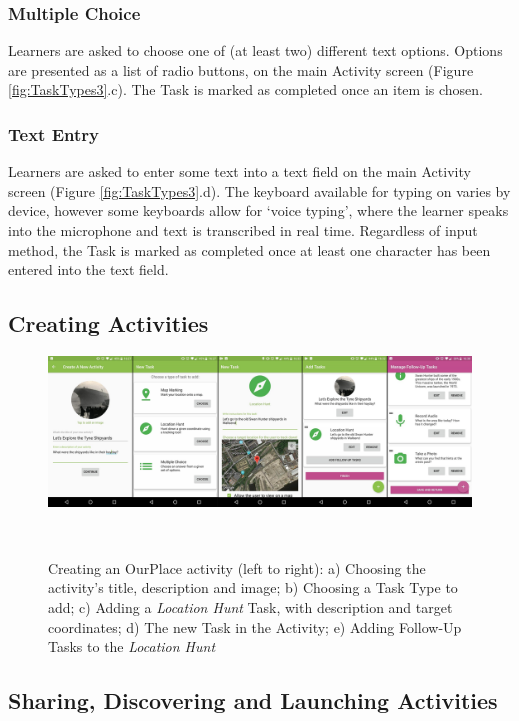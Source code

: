 \subsubsection*{Multiple Choice}
Learners are asked to choose one of (at least two) different text options. Options are presented as a list of radio buttons, on the main Activity screen (Figure \ref{fig:TaskTypes3}.c). The Task is marked as completed once an item is chosen.

\subsubsection*{Text Entry}
Learners are asked to enter some text into a text field on the main Activity screen (Figure \ref{fig:TaskTypes3}.d). The keyboard available for typing on varies by device, however some keyboards allow for `voice typing', where the learner speaks into the microphone and text is transcribed in real time. Regardless of input method, the Task is marked as completed once at least one character has been entered into the text field. 

\subsection{Creating Activities}

\begin{figure}
  \centering
  \includegraphics[width=1\columnwidth]{images/chapter05/activityCreation}
  \caption{Creating an OurPlace activity (left to right): a) Choosing the activity's title, description and image; b) Choosing a Task Type to add; c) Adding a \textit{Location Hunt} Task, with description and target coordinates; d) The new Task in the Activity; e) Adding Follow-Up Tasks to the \textit{Location Hunt}  }~\label{fig:ActivityCreation}
\end{figure}

\subsection{Sharing, Discovering and Launching Activities}
\label{sec:SharingActivities}

